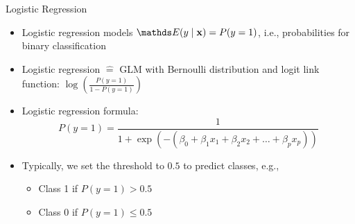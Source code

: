 \documentclass[11pt,compress,t,notes=noshow, aspectratio=169, xcolor=table]{beamer}
\begin{document}
\begin{frame}{Logistic Regression}
\begin{itemize}
    \item Logistic regression models $\E(y \mid \xv) = P(y = 1)$, i.e., probabilities for binary classification 
    \item Logistic regression $\hat{=}$ GLM with Bernoulli distribution and logit link function: $\log\left(\frac{P(y = 1)}{1 - P(y = 1)}\right)$ 
    \item Logistic regression formula:
    $$P(y = 1) =\frac{1}{1 + \exp(-( \beta_0 + \beta_1 x_1 + \beta_2 x_2 + \ldots + \beta_p x_p ))} $$
    \item Typically, we set the threshold to $0.5$ to predict classes, e.g.,
        \begin{itemize}
            \item Class 1 if $P(y=1) > 0.5$
            \item Class 0 if $P(y=1) \leq 0.5$
        \end{itemize}
\end{itemize}
\end{frame}


\end{document}
